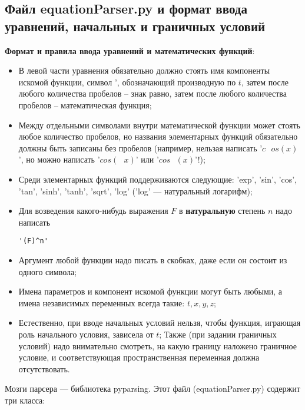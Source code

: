 \documentclass[a4paper]{article}
\begin{document}
\newpage
\subsection{\Large Файл equationParser.py и формат ввода уравнений, начальных и граничных условий}
{\bf Формат и правила ввода уравнений и математических функций}:
\begin{itemize}
\item В левой части уравнения обязательно должно стоять имя компоненты искомой функции, символ ', обозначающий производную по $t$, затем после любого количества пробелов -- знак равно, затем после любого количества пробелов -- математическая функция;
\item Между отдельными символами внутри математической функции может стоять любое количество пробелов, но названия элементарных функций обязательно должны быть записаны без пробелов (например, нельзая написать '$c\ \ \ os(x)$', но можно написать '$cos(\ \ \ x)$' или '$cos\ \ \ (x)$'!);
\item Среди элементарных функций поддерживаются следующие: 'exp', 'sin', 'cos', 'tan', 'sinh', 'tanh', 'sqrt', 'log' ('log' --- натуральный логарифм);
\item Для возведения какого-нибудь выражения $F$ в {\bf натуральную} степень $n$ надо написать \begin{verbatim}'(F)^n'\end{verbatim}
\item Аргумент любой функции надо писать в скобках, даже если он состоит из одного символа;
\item Имена параметров и компонент искомой функции могут быть любыми, а имена независимых переменных всегда такие: $t, x, y, z$;
\item Естественно, при вводе начальных условий нельзя, чтобы функция, играющая роль начального условия, зависела от $t$; Также (при задании граничных условий) надо внимательно смотреть, на какую границу наложено граничное условие, и соответствующая пространственная переменная должна отсутствовать.
\end{itemize}
Мозги парсера --- библиотека pyparsing. Этот файл (equationParser.py) содержит три класса:
\end{document}
